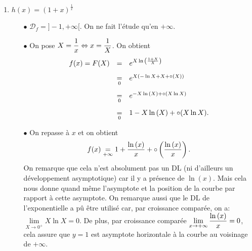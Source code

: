 \documentclass[a4paper, 11pt,reqno]{article}
\begin{document}
\begin{correction}
\begin{enumerate}
\begin{itemize}
$$\begin{array}{lll}
					                      & \underset{0}{=} & \ddp\frac{1}{X}\left( 1+\ddp\frac{X}{3}-\ddp\frac{X^2}{9}+\circ(X^2)  \right)\vsec \\
					                      & \underset{0}{=} & \ddp\frac{1}{X}+\ddp\frac{1}{3}-\ddp\frac{X}{9}+\circ(X).
				            \end{array}$$
			      \item[$\bullet$] On repasse \`a $x$ et on obtient
			            $$ f(x)\underset{+\infty}{=} x+\ddp\frac{1}{3}-\ddp\frac{1}{9x}+\circ\left(\ddp\frac{1}{x} \right)\qquad \hbox{et}\qquad f(x)\underset{-\infty}{=} x+\ddp\frac{1}{3}-\ddp\frac{1}{9x}+\circ\left(\ddp\frac{1}{x} \right).$$
			            Ainsi, la droite d'\'equation $y=x+\ddp\frac{1}{3}$ est asymptote oblique au voisinage de $+\infty$ et de $-\infty$.
			      \item[$\bullet$] Au voisinage de $+\infty$, $\ddp\frac{1}{9x}>0$ et au voisinage de $-\infty$, $\ddp\frac{1}{9x}<0$, ainsi la courbe $\mathcal{C}_f$ est au-dessus de son asymptote olique au voisinage de $+\infty$ et elle est en-dessous de son asymptote oblique au voisinage de $-\infty$.
		      \end{itemize}
		\item $h(x)=(1+x)^{\frac{1}{x}}$
		      \begin{itemize}
			      \item[$\bullet$] $\mathcal{D}_f=\rbrack -1,+\infty\lbrack$. On ne fait l'\'etude qu'en $+\infty$.
			      \item[$\bullet$] On pose $X=\displaystyle\frac{1}{x}\Leftrightarrow x= \displaystyle\frac{1}{X}$. On obtient
			            $$\begin{array}{lll}
					            f(x)=F(X) & =               & e^{X\ln{\left(\frac{1+X}{X}  \right)}} \vsec \\
					                      & \underset{0}{=} & e^{X\left( -\ln{X}+X+\circ(X)  \right)}\vsec \\
					                      & \underset{0}{=} & e^{-X\ln{(X)}+\circ (X\ln{X})}\vsec          \\
					                      & \underset{0}{=} & 1-X\ln{(X)}+\circ (X\ln{X}).
				            \end{array}$$
			      \item[$\bullet$] On repasse \`a $x$ et on obtient
			            $$ f(x)\underset{+\infty}{=} 1+\displaystyle\frac{\ln{(x)}}{x}+\circ\left(\displaystyle\frac{\ln{(x)}}{x} \right).$$
			            On remarque que cela n'est absolument pas un DL (ni d'ailleurs un d\'eveloppement asymptotique) car il y a pr\'esence de $\ln{(x)}$. Mais cela nous donne quand m\^eme l'asymptote et la position de la courbe par rapport \`a cette asymptote. On remarque aussi que le DL de l'exponentielle a p\^u \^etre utilis\'e car, par croissance compar\'ee, on a: $\lim\limits_{X\to 0^+} X\ln{X}=0$. De plus, par croissance compar\'ee  $\lim\limits_{x\to +\infty} \displaystyle\frac{\ln{(x)}}{x}=0$, cela assure que $y=1$ est asymptote horizontale \`a la courbe au voisinage de $+\infty$.

\end{itemize}
\end{enumerate}
\end{correction}
\end{document}
